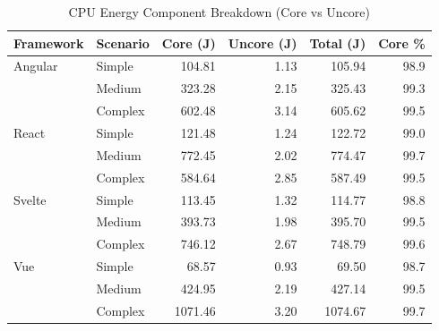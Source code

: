 \begin{table}[htbp]
\centering
\caption{CPU Energy Component Breakdown (Core vs Uncore)}
\label{tab:component_breakdown}
\begin{tabular}{llrrrr}
\toprule
\textbf{Framework} & \textbf{Scenario} & \textbf{Core (J)} & \textbf{Uncore (J)} & \textbf{Total (J)} & \textbf{Core \%} \\
\midrule
Angular    & Simple   &  104.81 &    1.13 &  105.94 &  98.9 \\
           & Medium   &  323.28 &    2.15 &  325.43 &  99.3 \\
           & Complex  &  602.48 &    3.14 &  605.62 &  99.5 \\
\midrule
React      & Simple   &  121.48 &    1.24 &  122.72 &  99.0 \\
           & Medium   &  772.45 &    2.02 &  774.47 &  99.7 \\
           & Complex  &  584.64 &    2.85 &  587.49 &  99.5 \\
\midrule
Svelte     & Simple   &  113.45 &    1.32 &  114.77 &  98.8 \\
           & Medium   &  393.73 &    1.98 &  395.70 &  99.5 \\
           & Complex  &  746.12 &    2.67 &  748.79 &  99.6 \\
\midrule
Vue        & Simple   &   68.57 &    0.93 &   69.50 &  98.7 \\
           & Medium   &  424.95 &    2.19 &  427.14 &  99.5 \\
           & Complex  & 1071.46 &    3.20 & 1074.67 &  99.7 \\
\bottomrule
\end{tabular}
\end{table}